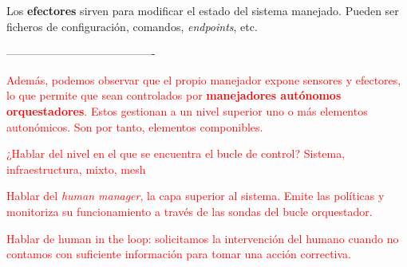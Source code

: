 Los \textbf{efectores} sirven para modificar el estado del sistema manejado. Pueden ser ficheros de configuración, comandos, \emph{endpoints}, etc.

----------------------------------------

\textcolor{red}{Además, podemos observar que el propio manejador expone sensores y efectores, lo que permite que sean controlados por \textbf{manejadores autónomos orquestadores}. Estos gestionan a un nivel superior uno o más elementos autonómicos. Son por tanto, elementos componibles.}

\textcolor{red}{¿Hablar del nivel en el que se encuentra el bucle de control? Sistema, infraestructura, mixto, mesh \cite{mendoncaGeneralityVsReusability2018}}

\textcolor{red}{Hablar del \emph{human manager}, la capa superior al sistema. Emite las políticas y monitoriza su funcionamiento a través de las sondas del bucle orquestador.}

\textcolor{red}{Hablar de human in the loop: solicitamos la intervención del humano cuando no contamos con suficiente información para tomar una acción correctiva.}
